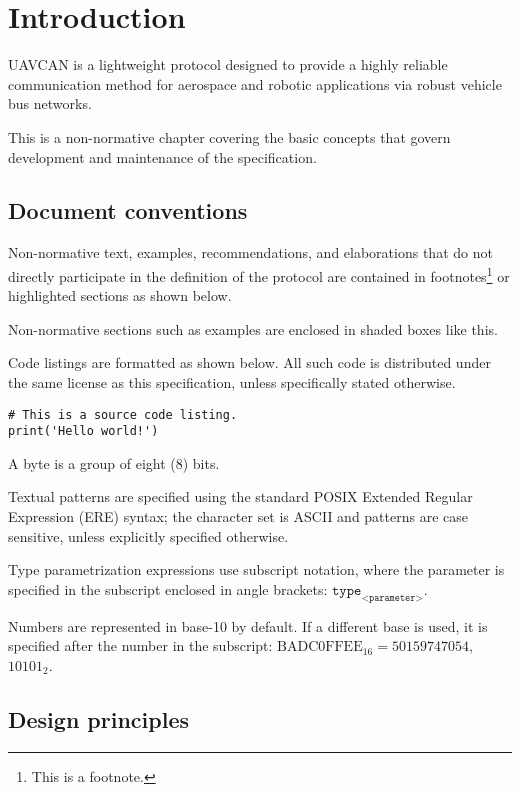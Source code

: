 \chapter{Introduction}\label{sec:introduction}

UAVCAN is a lightweight protocol designed to provide a highly reliable communication method for
aerospace and robotic applications via robust vehicle bus networks.

This is a non-normative chapter covering the basic concepts that govern development and maintenance of
the specification.

\section{Document conventions}

Non-normative text, examples, recommendations, and elaborations that do not directly participate
in the definition of the protocol are contained in footnotes\footnote{This is a footnote.}
or highlighted sections as shown below.

\begin{remark}
    Non-normative sections such as examples are enclosed in shaded boxes like this.
\end{remark}

Code listings are formatted as shown below.
All such code is distributed under the same license as this specification, unless specifically stated otherwise.

\begin{verbatim}
# This is a source code listing.
print('Hello world!')
\end{verbatim}

A byte is a group of eight (8) bits.

Textual patterns are specified using the standard
POSIX Extended Regular Expression (ERE) syntax;
the character set is ASCII and patterns are case sensitive, unless explicitly specified otherwise.

Type parametrization expressions use subscript notation,
where the parameter is specified in the subscript enclosed in angle brackets:
$\texttt{type}_\texttt{<parameter>}$.

Numbers are represented in base-10 by default.
If a different base is used, it is specified after the number in the subscript:
$\text{BADC0FFEE}_{16} = 50159747054$, $10101_2$.

\section{Design principles}


